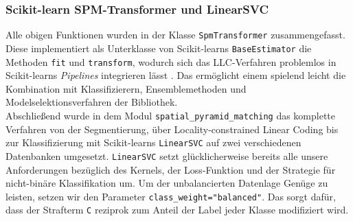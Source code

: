 \subsubsection{Scikit-learn SPM-Transformer und LinearSVC}
\label{sec:llc}

Alle obigen Funktionen wurden in der Klasse \texttt{SpmTransformer} zusammengefasst. Diese implementiert als Unterklasse von Scikit-learns \texttt{BaseEstimator} die Methoden \texttt{fit} und \texttt{transform}, wodurch sich das LLC-Verfahren problemlos in Scikit-learns \emph{Pipelines} integrieren lässt \cite{sklearn}. Das ermöglicht einem spielend leicht die Kombination mit Klassifizierern, Ensemblemethoden und Modelselektionsverfahren der Bibliothek. \\
Abschließend wurde in dem Modul \texttt{spatial\_pyramid\_matching} das komplette Verfahren von der Segmentierung, über Locality-constrained Linear Coding bis zur Klassifizierung mit Scikit-learns \texttt{LinearSVC} auf zwei verschiedenen Datenbanken umgesetzt. \texttt{LinearSVC} setzt glücklicherweise bereits alle unsere Anforderungen bezüglich des Kernels, der Loss-Funktion und der Strategie für nicht-binäre Klassifikation um. Um der unbalancierten Datenlage Genüge zu leisten, setzen wir den Parameter \texttt{class\_weight="balanced"}. Das sorgt dafür, dass der Strafterm \texttt{C} reziprok zum Anteil der Label jeder Klasse modifiziert wird.